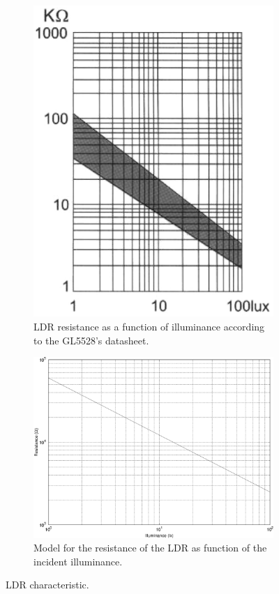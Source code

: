 \begin{figure}[h]
    \centering
    \begin{subfigure}[t]{0.39\textwidth}
	\centering
	\includegraphics[width=.95\textwidth]{img/LDR_datasheet}
	\caption{LDR resistance as a function of illuminance according to the GL5528's datasheet.}
	\label{fig:LDR_datasheet}
    \end{subfigure}
    \begin{subfigure}[t]{0.59\textwidth}
	\centering
	\includegraphics[width=.95\textwidth]{img/LDR_model}
	\caption{Model for the resistance of the LDR as function of the incident illuminance.}
	\label{fig:LDR_model}
    \end{subfigure}
    \caption{LDR characteristic.}
\end{figure}


